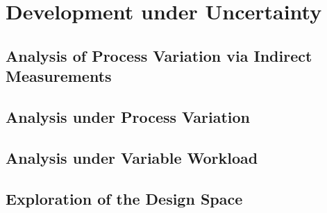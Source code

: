 \chapter{Development under Uncertainty}

\section{Analysis of Process Variation via Indirect Measurements}

\section{Analysis under Process Variation}

\section{Analysis under Variable Workload}

\section{Exploration of the Design Space}
